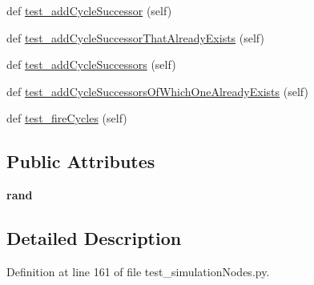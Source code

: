 \begin{DoxyCompactItemize}
\item 
def \hyperlink{class_n_e_a_t___py_genetics_1_1_n_e_a_t_1_1_tests_1_1_simulation_genome_tests_1_1test__simulatio45ecd57ba52657c3e14de63ce24b7f73_af290d2156db85e2109ef6722c25eb213}{test\+\_\+add\+Cycle\+Successor} (self)
\item 
def \hyperlink{class_n_e_a_t___py_genetics_1_1_n_e_a_t_1_1_tests_1_1_simulation_genome_tests_1_1test__simulatio45ecd57ba52657c3e14de63ce24b7f73_abd65f6b19f91eb3796411a7bc6f60cb0}{test\+\_\+add\+Cycle\+Successor\+That\+Already\+Exists} (self)
\item 
def \hyperlink{class_n_e_a_t___py_genetics_1_1_n_e_a_t_1_1_tests_1_1_simulation_genome_tests_1_1test__simulatio45ecd57ba52657c3e14de63ce24b7f73_ae41ca9680b1fc37c9033e68fab641eb5}{test\+\_\+add\+Cycle\+Successors} (self)
\item 
def \hyperlink{class_n_e_a_t___py_genetics_1_1_n_e_a_t_1_1_tests_1_1_simulation_genome_tests_1_1test__simulatio45ecd57ba52657c3e14de63ce24b7f73_abba2b6050d0f0b156684d6a8430595c0}{test\+\_\+add\+Cycle\+Successors\+Of\+Which\+One\+Already\+Exists} (self)
\item 
def \hyperlink{class_n_e_a_t___py_genetics_1_1_n_e_a_t_1_1_tests_1_1_simulation_genome_tests_1_1test__simulatio45ecd57ba52657c3e14de63ce24b7f73_ab3d073cdf68857190769fd380b63b842}{test\+\_\+fire\+Cycles} (self)
\end{DoxyCompactItemize}
\subsection*{Public Attributes}
\begin{DoxyCompactItemize}
\item 
{\bfseries rand}\hypertarget{class_n_e_a_t___py_genetics_1_1_n_e_a_t_1_1_tests_1_1_simulation_genome_tests_1_1test__simulatio45ecd57ba52657c3e14de63ce24b7f73_a0ad6f4a80ac5521840deb8b91dde6020}{}\label{class_n_e_a_t___py_genetics_1_1_n_e_a_t_1_1_tests_1_1_simulation_genome_tests_1_1test__simulatio45ecd57ba52657c3e14de63ce24b7f73_a0ad6f4a80ac5521840deb8b91dde6020}

\end{DoxyCompactItemize}


\subsection{Detailed Description}


Definition at line 161 of file test\+\_\+simulation\+Nodes.\+py.



